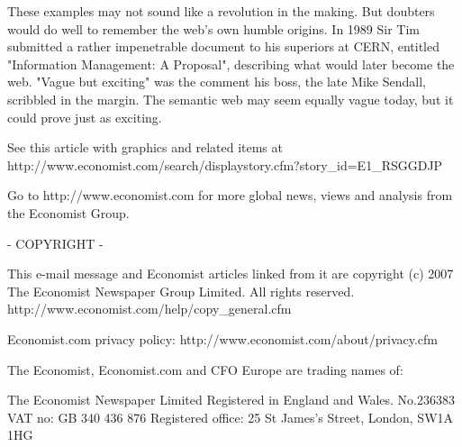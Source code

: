These examples may not sound like a revolution in the making. But doubters would do well to remember the web's own humble origins. In 1989 Sir Tim submitted a rather impenetrable document to his superiors at CERN, entitled "Information Management: A Proposal", describing what would later become the web. "Vague but exciting" was the comment his boss, the late Mike Sendall, scribbled in the margin. The semantic web may seem equally vague today, but it could prove just as exciting. 
 

See this article with graphics and related items at http://www.economist.com/search/displaystory.cfm?story_id=E1_RSGGDJP

Go to http://www.economist.com for more global news, views and analysis from the Economist Group.

- COPYRIGHT -

This e-mail message and Economist articles linked from it are copyright (c) 2007 The Economist Newspaper Group Limited. All rights reserved. http://www.economist.com/help/copy_general.cfm

Economist.com privacy policy: http://www.economist.com/about/privacy.cfm

The Economist, Economist.com and CFO Europe are trading names of: 

The Economist Newspaper Limited 
Registered in England and Wales. No.236383
VAT no: GB 340 436 876 
Registered office: 25 St James's Street, London, SW1A 1HG 



